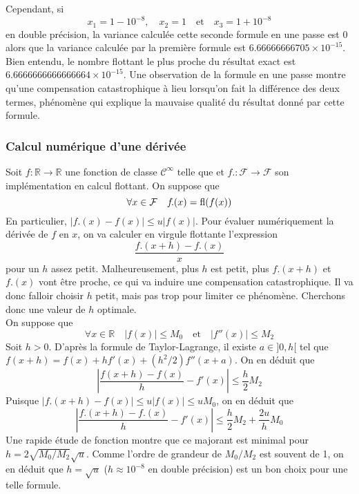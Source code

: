 \documentclass{article}
\newcommand{\R}{\mathbb{R}}
\newcommand{\abs}[1]{\left|#1\right|}
\newcommand{\fl}[1]{{\rm fl}(#1)}
\begin{document}
Cependant, si
\[x_1 = 1 - 10^{-8}, \quad x_2 = 1 \quad\text{et}\quad x_3 = 1 + 10^{-8}\]
en double précision, la variance calculée cette seconde formule en une passe
est 0 alors que la
variance calculée par la première formule est $6.66666666705 \times 10^{-15}$.
Bien entendu, le nombre flottant le plus proche du résultat exact est
$6.6666666666666664 \times 10^{-15}$. Une observation de la formule en une passe
montre qu'une compensation catastrophique à lieu lorsqu'on fait la différence
des deux termes, phénomène qui explique la mauvaise qualité du résultat donné
par cette formule.

\subsubsection{Calcul numérique d'une dérivée}

Soit $f:\R\to\R$ une fonction de classe $\mathcal{C}^{\infty}$ telle que
et $f\!.:\mathcal{F}\to\mathcal{F}$ son implémentation en calcul flottant.
On suppose que
\[\forall x\in\mathcal{F} \quad f\!.(x) = \fl{f(x)}\]
En particulier, $\abs{f\!.(x)-f(x)}\leq u\abs{f(x)}$. Pour évaluer numériquement
la dérivée de $f$ en $x$, on va calculer en virgule flottante l'expression
\[\frac{f\!.(x+h)-f\!.(x)}{x}\]
pour un $h$ assez petit. Malheureusement, plus $h$ est petit, plus
$f\!.(x+h)$ et $f\!.(x)$ vont être proche, ce qui va induire une compensation
catastrophique. Il va donc falloir choisir $h$ petit, mais pas trop pour
limiter ce phénomène. Cherchons donc une valeur de $h$ optimale.\\

On suppose que
\[\forall x\in\R \quad \abs{f(x)}\leq M_0 \quad\text{et}\quad
  \abs{f''(x)}\leq M_2\]
Soit $h>0$. D'après la formule de Taylor-Lagrange, il existe $a\in ]0,h[$ tel
que $f(x+h)=f(x)+hf'(x)+(h^2/2)f''(x+a)$. On en déduit que
\[\abs{\frac{f(x+h)-f(x)}{h}-f'(x)}\leq \frac{h}{2}M_2\]
Puisque $\abs{f\!.(x+h)-f\!(x)}\leq u\abs{f(x)}\leq u M_0$, on en déduit que
\[\abs{\frac{f\!.(x+h)-f\!.(x)}{h}-f'(x)}\leq
  \frac{h}{2}M_2+\frac{2u}{h} M_0\]
Une rapide étude de fonction montre que ce majorant est minimal pour
$h=2\sqrt{M_0/M_2} \sqrt{u}$. Comme l'ordre de grandeur de $M_0/M_2$ est
souvent de 1, on en déduit que $h=\sqrt{u}$
($h\approx 10^{-8}$ en double précision) est un bon choix pour une telle formule.\\
\end{document}
